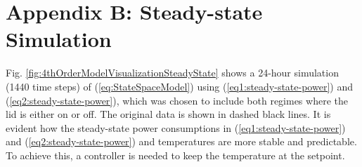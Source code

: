 \documentclass[conference]{IEEEtran}
\begin{document}
{\vspace{1mm}
\section*{Appendix B: Steady-state Simulation}\label{app:steady-state-simulation}
\vspace{-1mm}
Fig. \ref{fig:4thOrderModelVisualizationSteadyState} shows a 24-hour simulation (1440 time steps) of (\ref{eq:StateSpaceModel}) using (\ref{eq1:steady-state-power}) and (\ref{eq2:steady-state-power}), which was chosen to include both regimes where the lid is either on or off. The original data is shown in dashed black lines. It is evident how the steady-state power consumptions in (\ref{eq1:steady-state-power}) and (\ref{eq2:steady-state-power}) and temperatures are  more stable and predictable. To achieve this, a controller is needed to keep the temperature at the setpoint.

}
\end{document}
